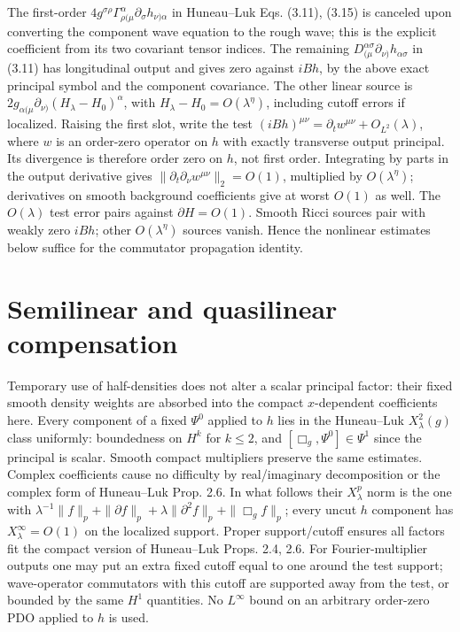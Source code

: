 \documentclass[11pt]{article}
\begin{document}
The first-order \(4g^{\sigma\rho}\Gamma^\alpha_{\rho(\mu}\partial_\sigma h_{\nu)\alpha}\) in Huneau--Luk Eqs. (3.11), (3.15) is canceled upon converting the component wave equation to the rough wave; this is the explicit coefficient from its two covariant tensor indices. The remaining \(D_{(\mu}^{\alpha\sigma}\partial_{\nu)}h_{\alpha\sigma}\) in (3.11) has longitudinal output and gives zero against \(iB h\), by the above exact principal symbol and the component covariance. The other linear source is \(2g_{\alpha(\mu}\partial_{\nu)}(H_\lambda-H_0)^\alpha\), with \(H_\lambda-H_0=O(\lambda^\eta)\), including cutoff errors if localized. Raising the first slot, write the test \((iBh)^{\mu\nu}=\partial_t w^{\mu\nu}+O_{L^2}(\lambda)\), where \(w\) is an order-zero operator on \(h\) with exactly transverse output principal. Its divergence is therefore order zero on \(h\), not first order. Integrating by parts in the output derivative gives \(\|\partial_t\partial_\nu w^{\mu\nu}\|_2=O(1)\), multiplied by \(O(\lambda^\eta)\); derivatives on smooth background coefficients give at worst \(O(1)\) as well. The \(O(\lambda)\) test error pairs against \(\partial H=O(1)\). Smooth Ricci sources pair with weakly zero \(iBh\); other \(O(\lambda^\eta)\) sources vanish. Hence the nonlinear estimates below suffice for the commutator propagation identity.

\section{Semilinear and quasilinear compensation}
\label{sec:comp}
Temporary use of half-densities does not alter a scalar principal factor: their fixed smooth density weights are absorbed into the compact \(x\)-dependent coefficients here. Every component of a fixed \(\Psi^0\) applied to \(h\) lies in the Huneau--Luk \(X_\lambda^2(g)\) class uniformly: boundedness on \(H^k\) for \(k\le2\), and \([\Box_g,\Psi^0]\in\Psi^1\) since the principal is scalar. Smooth compact multipliers preserve the same estimates. Complex coefficients cause no difficulty by real/imaginary decomposition or the complex form of Huneau--Luk Prop. 2.6. In what follows their \(X_\lambda^p\) norm is the one with \(\lambda^{-1}\|f\|_p+\|\partial f\|_p+\lambda\|\partial^2 f\|_p+\|\Box_g f\|_p\); every uncut \(h\) component has \(X_\lambda^\infty=O(1)\) on the localized support. Proper support/cutoff ensures all factors fit the compact version of Huneau--Luk Props. 2.4, 2.6. For Fourier-multiplier outputs one may put an extra fixed cutoff equal to one around the test support; wave-operator commutators with this cutoff are supported away from the test, or bounded by the same \(H^1\) quantities. No \(L^\infty\) bound on an arbitrary order-zero PDO applied to \(h\) is used.
\end{document}
